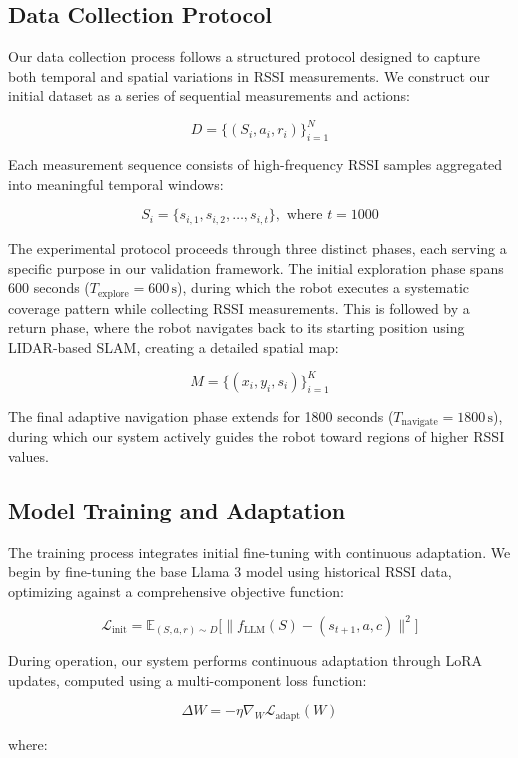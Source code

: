 \documentclass[12pt]{article}
\begin{document}
\subsection{Data Collection Protocol}

Our data collection process follows a structured protocol designed to capture both temporal and spatial variations in RSSI measurements. We construct our initial dataset as a series of sequential measurements and actions:

\[
D = \{(S_i, a_i, r_i)\}_{i=1}^N
\]

Each measurement sequence consists of high-frequency RSSI samples aggregated into meaningful temporal windows:

\[
S_i = \{s_{i,1}, s_{i,2}, \ldots, s_{i,t}\}, \text{ where } t = 1000
\]

The experimental protocol proceeds through three distinct phases, each serving a specific purpose in our validation framework. The initial exploration phase spans 600 seconds (\(T_{\text{explore}} = 600 \, \text{s}\)), during which the robot executes a systematic coverage pattern while collecting RSSI measurements. This is followed by a return phase, where the robot navigates back to its starting position using LIDAR-based SLAM, creating a detailed spatial map:

\[
M = \{(x_i, y_i, s_i)\}_{i=1}^K
\]

The final adaptive navigation phase extends for 1800 seconds (\(T_{\text{navigate}} = 1800 \, \text{s}\)), during which our system actively guides the robot toward regions of higher RSSI values.

\subsection{Model Training and Adaptation}

The training process integrates initial fine-tuning with continuous adaptation. We begin by fine-tuning the base Llama 3 model using historical RSSI data, optimizing against a comprehensive objective function:

\[
\mathcal{L}_{\text{init}} = \mathbb{E}_{(S,a,r)\sim D}\big[\|f_{\text{LLM}}(S) - (s_{t+1}, a, c)\|^2\big]
\]

During operation, our system performs continuous adaptation through LoRA updates, computed using a multi-component loss function:

\[
\Delta W = -\eta \nabla_W \mathcal{L}_{\text{adapt}}(W)
\]

where:
\end{document}
